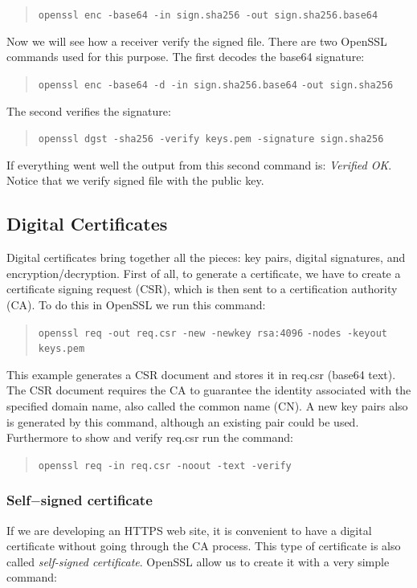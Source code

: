 \documentclass[11pt]{article}
\begin{document}
\begin{quote}
  \verb|openssl enc -base64 -in sign.sha256 -out sign.sha256.base64|
\end{quote}

Now we will see how a receiver verify the signed file. There are two OpenSSL commands used for this purpose. The first decodes the base64 signature:

\begin{quote}
  \verb|openssl enc -base64 -d -in sign.sha256.base64|\newline
  \verb|-out sign.sha256|
\end{quote}

The second verifies the signature:

\begin{quote}
  \verb|openssl dgst -sha256 -verify keys.pem -signature sign.sha256|
\end{quote}

If everything went well the output from this second command is: {\em Verified OK}. Notice that we verify signed file with the public key.

\subsection{Digital Certificates}
Digital certificates bring together all the pieces: key pairs, digital signatures, and encryption/decryption. First of all, to generate a certificate, we have to create a certificate signing request (CSR), which is then sent to a certification authority (CA). To do this in OpenSSL we run this command:

\begin{quote}
  \verb|openssl req -out req.csr -new -newkey rsa:4096|\newline
  \verb|-nodes -keyout keys.pem|
\end{quote}

This example generates a CSR document and stores it in req.csr (base64 text). The CSR document requires the CA to guarantee the identity associated with the specified domain name, also called the common name (CN). A new key pairs also is generated by this command, although an existing pair could be used. Furthermore to show and verify req.csr run the command:

\begin{quote}
  \verb|openssl req -in req.csr -noout -text -verify|
\end{quote}

\subsubsection{Self$-$signed certificate}
If we are developing an HTTPS web site, it is convenient to have a digital certificate without going through the CA process. This type of certificate is also called {\em self-signed certificate}. OpenSSL allow us to create it with a very simple command:
\end{document}
